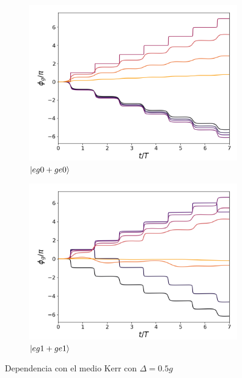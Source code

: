 \begin{figure}[h]
    \centering
    \begin{subfigure}{0.49\textwidth}
        \includegraphics[width=\textwidth]{figuras/ch5/dependencia/eg0+/ker d=0.5g.png}
        \caption{$\ket{eg0+ge0}$}
        \label{fig5:dependencia kerr 2 eg0}
    \end{subfigure}
    \hfill
    \begin{subfigure}{0.49\textwidth}
        \includegraphics[width=\textwidth]{figuras/ch5/dependencia/eg1+/kerr d=0.5g.png}
        \caption{$\ket{eg1+ge1}$}
        \label{fig5:dependencia kerr 2 eg1}
    \end{subfigure}
    \caption{Dependencia con el medio Kerr con $\Delta=0.5g$}
    \label{fig5:dependencia kerr 2}
\end{figure}

